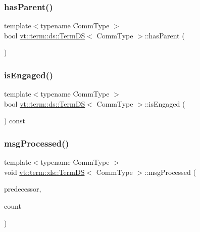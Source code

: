 \mbox{\label{structvt_1_1term_1_1ds_1_1_term_d_s_a5d112306bb319f8d5f542a104ccb87a6}} 
\subsubsection{\texorpdfstring{has\+Parent()}{hasParent()}}
{\footnotesize\ttfamily template$<$typename Comm\+Type $>$ \\
bool \hyperlink{structvt_1_1term_1_1ds_1_1_term_d_s}{vt\+::term\+::ds\+::\+Term\+DS}$<$ Comm\+Type $>$\+::has\+Parent (\begin{DoxyParamCaption}{ }\end{DoxyParamCaption})}

\mbox{\label{structvt_1_1term_1_1ds_1_1_term_d_s_a5587da947484c81472ff0a4563a2efb4}} 
\subsubsection{\texorpdfstring{is\+Engaged()}{isEngaged()}}
{\footnotesize\ttfamily template$<$typename Comm\+Type $>$ \\
bool \hyperlink{structvt_1_1term_1_1ds_1_1_term_d_s}{vt\+::term\+::ds\+::\+Term\+DS}$<$ Comm\+Type $>$\+::is\+Engaged (\begin{DoxyParamCaption}{ }\end{DoxyParamCaption}) const\hspace{0.3cm}{\ttfamily [inline]}}

\mbox{\label{structvt_1_1term_1_1ds_1_1_term_d_s_a16ad493d9d01db734c20ea9a55b0ffc5}} 
\subsubsection{\texorpdfstring{msg\+Processed()}{msgProcessed()}}
{\footnotesize\ttfamily template$<$typename Comm\+Type $>$ \\
void \hyperlink{structvt_1_1term_1_1ds_1_1_term_d_s}{vt\+::term\+::ds\+::\+Term\+DS}$<$ Comm\+Type $>$\+::msg\+Processed (\begin{DoxyParamCaption}\item[{\hyperlink{namespacevt_a866da9d0efc19c0a1ce79e9e492f47e2}{Node\+Type}}]{predecessor,  }\item[{\hyperlink{structvt_1_1term_1_1ds_1_1_term_d_s_a54f4ebd7e1ecb59c32c0f5b03ef9f20b}{Count\+Type}}]{count }\end{DoxyParamCaption})}

